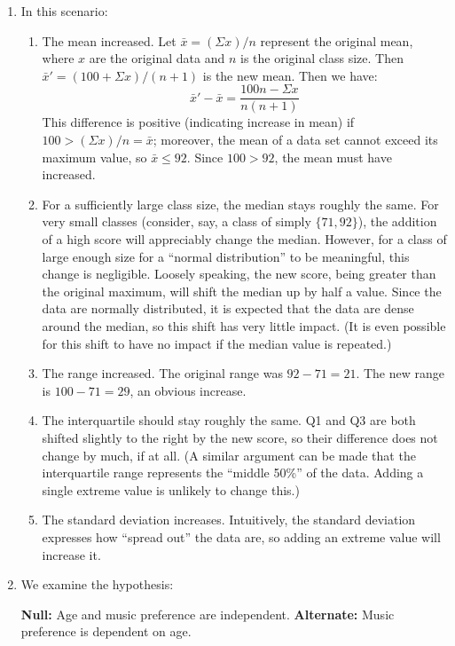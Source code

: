 \documentclass{article}
\begin{document}
\begin{enumerate}
  \item In this scenario:
    \begin{enumerate}
      \item The mean increased. Let $\bar{x} = (\Sigma x)/n$ represent the original mean, where $x$ are the original data and $n$ is the original class size. Then $\bar{x}' = (100 + \Sigma x)/(n+1)$ is the new mean. Then we have:
        \begin{equation}
          \bar{x}' - \bar{x} = \frac{100n - \Sigma x}{n(n+1)}
        \end{equation}
      This difference is positive (indicating increase in mean) if $100 > (\Sigma x)/n = \bar{x}$; moreover, the mean of a data set cannot exceed its maximum value, so $\bar{x} \le 92$. Since $100 > 92$, the mean must have increased.
      \item For a sufficiently large class size, the median stays roughly the same. For very small classes (consider, say, a class of simply $\{71, 92\}$), the addition of a high score will appreciably change the median. However, for a class of large enough size for a ``normal distribution'' to be meaningful, this change is negligible. Loosely speaking, the new score, being greater than the original maximum, will shift the median up by half a value. Since the data are normally distributed, it is expected that the data are dense around the median, so this shift has very little impact. (It is even possible for this shift to have no impact if the median value is repeated.)
      \item The range increased. The original range was $92-71=21$. The new range is $100-71=29$, an obvious increase.
      \item The interquartile should stay roughly the same. Q1 and Q3 are both shifted slightly to the right by the new score, so their difference does not change by much, if at all. (A similar argument can be made that the interquartile range represents the ``middle 50\%'' of the data. Adding a single extreme value is unlikely to change this.)
      \item The standard deviation increases. Intuitively, the standard deviation expresses how ``spread out'' the data are, so adding an extreme value will increase it.
    \end{enumerate}

  \item We examine the hypothesis:

    \textbf{Null:} Age and music preference are independent. \newline
    \textbf{Alternate:} Music preference is dependent on age.


\end{enumerate}
\end{document}
